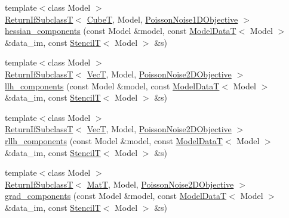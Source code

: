 \begin{DoxyCompactItemize}
\item 
{\footnotesize template$<$class Model $>$ }\\\hyperlink{namespacemappel_a3b77d227658ba3ba9e16fea6fa6e626d}{Return\+If\+SubclassT}$<$ \hyperlink{namespacemappel_ab2afab4e6c8805e83946670d882768c2}{CubeT}, Model, \hyperlink{classmappel_1_1PoissonNoise1DObjective}{Poisson\+Noise1\+D\+Objective} $>$ \hyperlink{namespacemappel_1_1methods_1_1likelihood_1_1debug_a3ce1dba1970e94b391b4a60792ee635a}{hessian\+\_\+components} (const Model \&model, const \hyperlink{namespacemappel_a97f050df953605381ae9c901c3b125f1}{Model\+DataT}$<$ Model $>$ \&data\+\_\+im, const \hyperlink{namespacemappel_a3a06598240007876f8c4bf834ad86197}{StencilT}$<$ Model $>$ \&s)
\item 
{\footnotesize template$<$class Model $>$ }\\\hyperlink{namespacemappel_a3b77d227658ba3ba9e16fea6fa6e626d}{Return\+If\+SubclassT}$<$ \hyperlink{namespacemappel_a2225ad69f358daa3f4f99282a35b9a3a}{VecT}, Model, \hyperlink{classmappel_1_1PoissonNoise2DObjective}{Poisson\+Noise2\+D\+Objective} $>$ \hyperlink{namespacemappel_1_1methods_1_1likelihood_1_1debug_a47e4b71af29f5c8d435e5a8880fe254a}{llh\+\_\+components} (const Model \&model, const \hyperlink{namespacemappel_a97f050df953605381ae9c901c3b125f1}{Model\+DataT}$<$ Model $>$ \&data\+\_\+im, const \hyperlink{namespacemappel_a3a06598240007876f8c4bf834ad86197}{StencilT}$<$ Model $>$ \&s)
\item 
{\footnotesize template$<$class Model $>$ }\\\hyperlink{namespacemappel_a3b77d227658ba3ba9e16fea6fa6e626d}{Return\+If\+SubclassT}$<$ \hyperlink{namespacemappel_a2225ad69f358daa3f4f99282a35b9a3a}{VecT}, Model, \hyperlink{classmappel_1_1PoissonNoise2DObjective}{Poisson\+Noise2\+D\+Objective} $>$ \hyperlink{namespacemappel_1_1methods_1_1likelihood_1_1debug_ac91e6c82e246b21c5f6dc2f9d8ce295d}{rllh\+\_\+components} (const Model \&model, const \hyperlink{namespacemappel_a97f050df953605381ae9c901c3b125f1}{Model\+DataT}$<$ Model $>$ \&data\+\_\+im, const \hyperlink{namespacemappel_a3a06598240007876f8c4bf834ad86197}{StencilT}$<$ Model $>$ \&s)
\item 
{\footnotesize template$<$class Model $>$ }\\\hyperlink{namespacemappel_a3b77d227658ba3ba9e16fea6fa6e626d}{Return\+If\+SubclassT}$<$ \hyperlink{namespacemappel_a7091ab87c528041f7e2027195fad8915}{MatT}, Model, \hyperlink{classmappel_1_1PoissonNoise2DObjective}{Poisson\+Noise2\+D\+Objective} $>$ \hyperlink{namespacemappel_1_1methods_1_1likelihood_1_1debug_aeb75ad8daa3b69f3cf800cf38f17656d}{grad\+\_\+components} (const Model \&model, const \hyperlink{namespacemappel_a97f050df953605381ae9c901c3b125f1}{Model\+DataT}$<$ Model $>$ \&data\+\_\+im, const \hyperlink{namespacemappel_a3a06598240007876f8c4bf834ad86197}{StencilT}$<$ Model $>$ \&s)

\end{DoxyCompactItemize}

